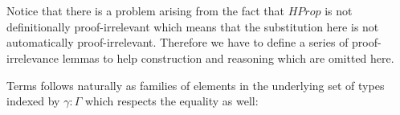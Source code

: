 \begin{code}
\>[4] \<[11]%
\>[11]\AgdaSymbol{:}  \AgdaSymbol{:}   \AgdaSymbol{)(} \AgdaSymbol{:}    \AgdaSymbol{)}  \<[42]%
\>[42]\<%
\\
\>[0]\<[13]%
\>[13]\AgdaFunction{[}   \AgdaFunction{]}  \AgdaFunction{[}  \AgdaFunction{]refl}   \<%
\\
%
\\
\>[0]\<[4]%
\>[4] \AgdaSymbol{:}    \AgdaSymbol{:}   \AgdaSymbol{\}}\<%
\\
\>[0]\<[13]%
\>[13]\AgdaSymbol{\{} \AgdaSymbol{:} \AgdaFunction{[}  \AgdaFunction{]}   \AgdaSymbol{\}\{} \AgdaSymbol{:} \AgdaFunction{[}  \AgdaFunction{]}   \AgdaSymbol{\}}\<%
\\
\>[0]\<[13]%
\>[13]\AgdaSymbol{(} \AgdaSymbol{:}    \AgdaSymbol{)}  \<[30]%
\>[30]\<%
\\
\>[0]\<[13]%
\>[13]\AgdaFunction{[}   \AgdaFunction{]}   \AgdaSymbol{(}  \AgdaSymbol{)}   \AgdaSymbol{(}\AgdaFunction{[}  \AgdaFunction{]trans}  \AgdaSymbol{)} \<%
\\
\end{code}

Notice that there is a problem arising from the fact that $HProp$ is not definitionally proof-irrelevant which means that the substitution here is not automatically proof-irrelevant. Therefore we have to define a series of proof-irrelevance lemmas to help construction and reasoning which are omitted here.

Terms follows naturally as families of elements in the underlying set of types indexed by $\gamma : \Gamma$ which respects the equality as well:


